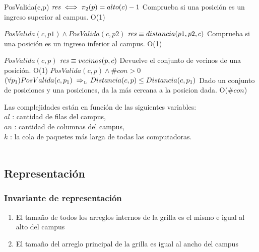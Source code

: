  {PosValida(c,p)}
 {$\text{\textit{res}} \iff \pi_2(p)=alto(c)-1 $}
 {Comprueba si una posición es un ingreso superior al campus.}
 {O(1)}
 {}

 {$PosValida(c,p1) \land PosValida(c,p2)$}
 {$\text{\textit{res}} \equiv distancia (p1, p2, c) $}
 {Comprueba si una posición es un ingreso inferior al campus.}
 {O(1)}
 {}
 
 {$PosValida(c,p)$}
 {$\text{\textit{res}} \equiv vecinos (p, c) $}
 {Devuelve el conjunto de vecinos de una posición.}
 {O(1)}
 {}
 {$PosValida(c,p)\land \#con>0$}
 {$(\forall p_1) PosValida(c, p_1) \impluego Distancia(c,p) \leq Distancia(c, p_1) $}
 {Dado un conjunto de posiciones y una posiciones, da la más cercana a la posicion dada.}
 {O($\#con$)}
 {}
 
Las complejidades están en función de las siguientes variables:\\
$al$ : cantidad de filas del campus, \\
$an$ : cantidad de columnas del campus, \\
$k$ : la cola de paquetes más larga de todas las computadoras. 
\\ \\



\subsection{Representación}


\subsubsection*{Invariante de representación}

\begin{enumerate}
  \item  El tamaño de todos los arreglos internos de la grilla es el mismo e igual al alto del campus
  \item El tamaño del arreglo principal de la grilla es igual al ancho del campus
\end{enumerate}  

